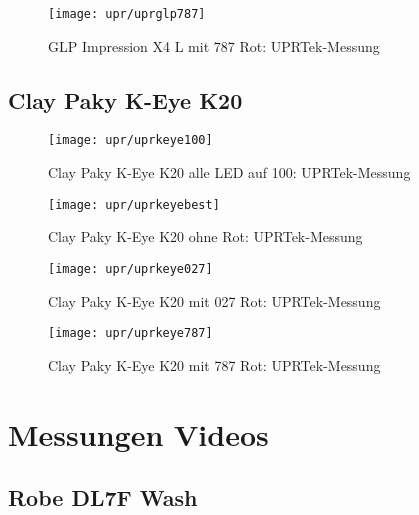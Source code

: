 \documentclass[pagesize,paper=A4,fontsize=12pt,utf8,numbers=noenddot,bibliography=totoc,listof=totoc,DIV=11,BCOR=1mm]{scrreprt}
\begin{document}
\begin{figure}[htp]     %
\centering
\texttt{[image: upr/uprglp787]} 
\caption {GLP Impression X4 L mit 787 Rot: UPRTek-Messung} 
\end{figure}



\subsection{Clay Paky K-Eye K20}

\begin{figure}[htp]     %
\centering
\texttt{[image: upr/uprkeye100]} 
\caption {Clay Paky K-Eye K20 alle LED auf 100: UPRTek-Messung} 
\end{figure}

\begin{figure}[htp]     %
\centering
\texttt{[image: upr/uprkeyebest]} 
\caption {Clay Paky K-Eye K20 ohne Rot: UPRTek-Messung} 
\end{figure}

\begin{figure}[htp]     %
\centering
\texttt{[image: upr/uprkeye027]} 
\caption {Clay Paky K-Eye K20 mit 027 Rot: UPRTek-Messung} 
\end{figure}

\begin{figure}[htp]     %
\centering
\texttt{[image: upr/uprkeye787]} 
\caption {Clay Paky K-Eye K20 mit 787 Rot: UPRTek-Messung} 
\end{figure}




\section{Messungen Videos}

\subsection{ Robe DL7F Wash}
\end{document}
